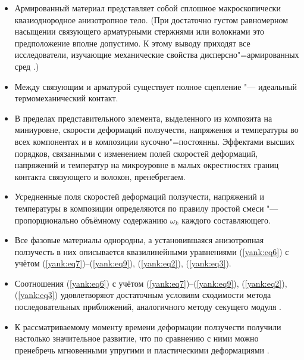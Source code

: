 \begin{itemize}


\item[1.] Армированный материал представляет собой сплошное
макроскопически квазиоднородное анизотропное тело. (При достаточно
густом равномерном насыщении связующего арматурными стержнями или
волокнами это предположение вполне допустимо. К этому выводу
приходят все исследователи, изучающие механические свойства
дисперсно"=армированных сред \cite{yank:bib7}.)

\item[2.] Между связующим и арматурой существует полное сцепление "---
идеальный термомеханический контакт.

\item[3.] В пределах представительного элемента, выделенного из композита
на миниуровне, скорости деформаций ползучести, напряжения и
температуры во всех компонентах и в композиции кусочно"=постоянны.
Эффектами высших порядков, связанными с изменением полей скоростей
деформаций, напряжений и температур на микроуровне в малых
окрестностях границ контакта связующего и волокон, пренебрегаем.

\item[4.] Усредненные поля скоростей деформаций ползучести, напряжений и
температуры в композиции определяются по правилу простой смеси
"--- пропорционально объёмному содержанию $\omega _k $ каждого
составляющего.

\item[5.] Все фазовые материалы однородны, а установившаяся анизотропная
ползучесть в них описывается квазилинейными уравнениями
(\ref{yank:eq6}) с учётом (\ref{yank:eq7})--(\ref{yank:eq9}),
(\ref{yank:eq2}), (\ref{yank:eq3}).

\item[6.] Соотношения (\ref{yank:eq6}) с учётом
(\ref{yank:eq7})--(\ref{yank:eq9}), (\ref{yank:eq2}),
(\ref{yank:eq3}) удовлетворяют достаточным условиям сходимости
метода последовательных приближений, аналогичного методу секущего
модуля \cite{yank:bib8}.

\item[7.] К рассматриваемому моменту времени деформации ползучести
получили настолько значительное развитие, что по сравнению с ними
можно пренебречь мгновенными упругими и пластическими деформациями
\cite{yank:bib3,yank:bib8}.

\end{itemize}

